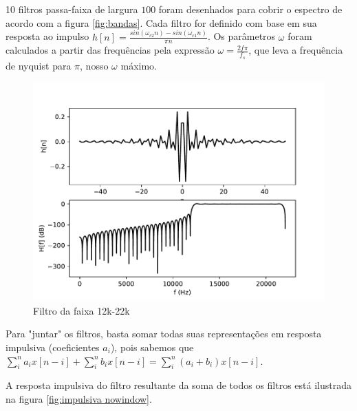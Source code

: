 
10 filtros passa-faixa de largura $100$ foram desenhados para cobrir o espectro de acordo com a figura \ref{fig:bandas}. Cada filtro for definido com base em sua resposta ao impulso $h[n]=\frac{sin(\omega_{c2}n)-sin(\omega_{c1}n)}{\pi n}$. Os parâmetros $\omega$ foram calculados a partir das frequências pela expressão $\omega = \frac{2f\pi}{f_s}$, que leva a frequência de nyquist para $\pi$, nosso $\omega$ máximo.

\begin{figure}[h]
    \centering
    \includegraphics[scale=0.8]{fig/filter9.pdf}
    \caption{Filtro da faixa 12k-22k}
    \label{fig:fnowindow}
\end{figure}

Para "juntar" os filtros, basta somar todas suas representações em resposta impulsiva (coeficientes $a_i$), pois sabemos que $\sum\limits_i^na_ix[n-i]+\sum\limits_i^nb_ix[n-i] = \sum\limits_i^n(a_i+b_i)x[n-i]$.

A resposta impulsiva do filtro resultante da soma de todos os filtros está ilustrada na figura \ref{fig:impulsiva nowindow}.

